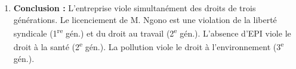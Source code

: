 \documentclass[11pt]{article}
\newcommand{\cle}[1]{{\popxbold\color{popdark}#1}}
\begin{document}
\begin{exoresolu}
\begin{enumerate}
\begin{itemize}
                \item \cle{Interdépendance :} L'absence d'EPI (DESC) menace le droit à la vie/santé (1\textsuperscript{re} gén.).
                \item \cle{Universalité :} Les riverains (non-employés) sont titulaires du droit à l'environnement.
            \end{itemize}
        \item \textbf{Conclusion :} L'entreprise viole simultanément des droits de trois générations. Le licenciement de M. Ngono est une violation de la liberté syndicale (1\textsuperscript{re} gén.) et du droit au travail (2\textsuperscript{e} gén.). L'absence d'EPI viole le droit à la santé (2\textsuperscript{e} gén.). La pollution viole le droit à l'environnement (3\textsuperscript{e} gén.).
    \end{enumerate}
\end{exoresolu}
\end{document}
